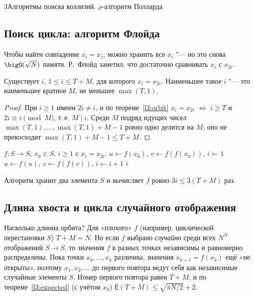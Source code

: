 \begin{lecture}{3}{Алгоритмы поиска коллизий. \texorpdfstring{$\rho$}{ρ}-алгоритм Полларда}
\subsection{Поиск цикла: алгоритм Флойда}

Чтобы найти совпадение $x_i = x_j$, можно хранить все $x_i$ "--- но это снова $\bigO(\sqrt N)$
памяти. Р.~Флойд заметил, что достаточно сравнивать $x_i$ с $x_{2i}$.

\begin{theorem}[Флойд]\label{l3:floyd}
Существует $i$, $1 \le i \le T + M$, для которого $x_i = x_{2i}$. Наименьшее такое
$i$ "--- это наименьшее кратное $M$, не меньшее $\max(T, 1)$.
\end{theorem}

\begin{proof}
При $i \ge 1$ имеем $2i \ne i$, и по теореме~\ref{l3:orbit} $x_i = x_{2i}$ $\iff$
$i \ge T$ и $2i \equiv i \pmod M$, т.\,е. $M \mid i$. Среди $M$ подряд идущих чисел
$\max(T,1), \dots, \max(T,1) + M - 1$ ровно одно делится на $M$; оно не превосходит
$\max(T, 1) + M - 1 \le T + M$.
\end{proof}

\begin{algorithm}
\begin{algorithmic}[1]
\Require $f\colon S \to S$, $x_0 \in S$.
\Ensure $i \ge 1$ с $x_i = x_{2i}$.
\State $u \gets f(x_0)$, \quad $v \gets f(f(x_0))$, \quad $i \gets 1$
  \State $u \gets f(u)$, \quad $v \gets f(f(v))$, \quad $i \gets i + 1$
\EndWhile
\State \Return $i$
\end{algorithmic}
\end{algorithm}

Алгоритм хранит два элемента $S$ и вычисляет $f$ ровно $3i \le 3(T + M)$ раз.


\subsection{Длина хвоста и цикла случайного отображения}

Насколько длинна орбита? Для «плохого» $f$ (например, циклической перестановки $S$)
$T + M = N$. Но если $f$ выбрано \emph{случайно} среди всех $N^N$ отображений $S \to S$,
то значения $f$ в разных точках независимы и равномерно распределены. Пока точки
$x_0, \dots, x_k$ различны, значения $x_{k+1} = f(x_k)$ ещё «не открыты», поэтому
$x_1, x_2, \dots$ до первого повтора ведут себя как независимые случайные элементы $S$.
Номер первого повтора равен $T + M$, и по теореме~\ref{l3:expected} (с учётом $x_0$)
$\mathsf{E}(T + M) \le \sqrt{\pi N/2} + 2$.


\end{lecture}
